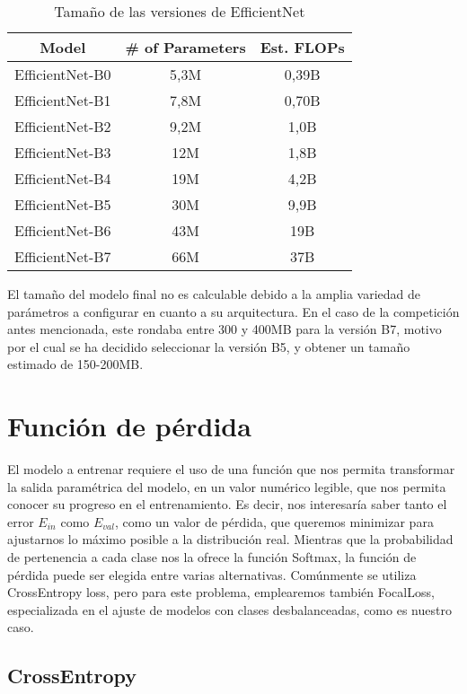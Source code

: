 \begin{table}[!ht]
	\centering
	\begin{tabular}{|c|c|c|}
		\hline
		\textbf{Model} & \textbf{\# of Parameters} & \textbf{Est. FLOPs} \\ \hline
		EfficientNet-B0 & 5,3M & 0,39B \\ \hline
		EfficientNet-B1 & 7,8M & 0,70B \\ \hline
		EfficientNet-B2 & 9,2M & 1,0B \\ \hline
		EfficientNet-B3 & 12M & 1,8B \\ \hline
		EfficientNet-B4 & 19M & 4,2B \\ \hline
		EfficientNet-B5 & 30M & 9,9B \\ \hline
		EfficientNet-B6 & 43M & 19B \\ \hline
		EfficientNet-B7 & 66M & 37B \\ \hline
	\end{tabular}
	\caption{Tamaño de las versiones de EfficientNet \cite{tan2020efficientnet}}
\end{table}

El tamaño del modelo final no es calculable debido a la amplia variedad de parámetros a configurar en cuanto a su arquitectura. En el caso de la competición antes mencionada, este rondaba entre 300 y 400MB para la versión B7, motivo por el cual se ha decidido seleccionar la versión B5, y obtener un tamaño estimado de 150-200MB.

\section{Función de pérdida}

El modelo a entrenar requiere el uso de una función que nos permita transformar la salida paramétrica del modelo, en un valor numérico legible, que nos permita conocer su progreso en el entrenamiento.  Es decir, nos interesaría saber tanto el error $E_{in}$ como $E_{val}$, como un valor de pérdida, que queremos minimizar para ajustarnos lo máximo posible a la distribución real. Mientras que la probabilidad de pertenencia a cada clase nos la ofrece la función Softmax, la función de pérdida puede ser elegida entre varias alternativas. Comúnmente se utiliza CrossEntropy loss, pero para este problema, emplearemos también FocalLoss, especializada en el ajuste de modelos con clases desbalanceadas, como es nuestro caso.

\subsection{CrossEntropy}

